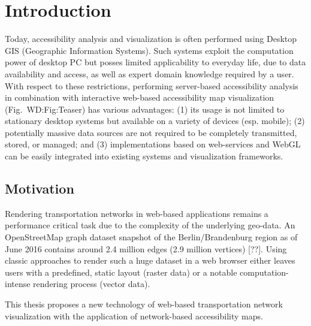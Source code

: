 
\cleardoublepage              %
\chapter{Introduction}
  \label{chap:intro}
  Today, accessibility analysis and visualization is often performed using Desktop GIS (Geographic Information Systems). Such systems exploit the computation power of desktop PC but posses limited applicability to everyday life, due to data availability and access, as well as expert domain knowledge required by a user. With respect to these restrictions, performing server-based accessibility analysis in combination with interactive web-based accessibility map visualization (Fig.~{WD:Fig:Teaser}) has various advantages: (1) its usage is not limited to stationary desktop systems but available on a variety of devices (esp. mobile); (2) potentially massive data sources are not required to be completely transmitted, stored, or managed; and (3) implementations based on web-services and WebGL \cite{Jackson2016} can be easily integrated into existing systems and visualization frameworks.\par
  \section{Motivation}
    \label{sec:intro:motiv}
    Rendering transportation networks in web-based applications remains a performance critical task due to the complexity of the underlying geo-data. An OpenStreetMap graph dataset snapshot of the Berlin/Brandenburg region as of June 2016 contains around 2.4 million edges (2.9 million vertices) [??]. Using classic approaches to render such a huge dataset in a web browser either leaves users with a predefined, static layout (raster data) or a notable computation-intense rendering process (vector data).\par
    This thesis proposes a new technology of web-based transportation network visualization with the application of network-based accessibility maps.\par
